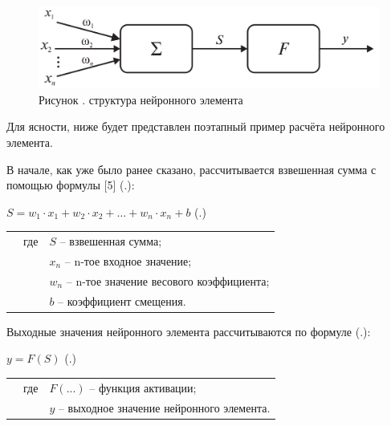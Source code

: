 {  \begin{figure}[H]
    \centering
    \def\svgwidth{\textwidth}
    \includegraphics[width=\textwidth]{images/Neuron.png}
    \caption*{\gostFont Рисунок \thechaptercntr .\theimagecntr \spc {--} структура нейронного элемента}
    \label{fig:Neuron}
  \end{figure} \addtocounter{imagecntr}{1}

  \par \redline Для ясности, ниже будет представлен поэтапный пример расчёта нейронного элемента.

  \par \redline В начале, как уже было ранее сказано, рассчитывается взвешенная сумма с помощью формулы [5] (\thechaptercntr .\theformulacntr):

	\formulaspace
	\par \redline $S = w_1 \cdot x_1 + w_2 \cdot x_2 + \dots + w_n \cdot x_n + b$ \hfill (\thechaptercntr .\theformulacntr) \redline
	\formulaspace \addtocounter{formulacntr}{1}

  \begin{tabular}{p{}p{}p{}}
		& где  & $S$ {--} взвешенная сумма; \\
		& 	   & $x_n$ {--} n-тое входное значение; \\
    & 	   & $w_n$ {--} n-тое значение весового коэффициента; \\
    & 	   & $b$ {--} коэффициент смещения. \\
  \end{tabular}

  \par \redline Выходные значения нейронного элемента рассчитываются по формуле (\thechaptercntr .\theformulacntr):

	\formulaspace
	\par \redline $y = F \left(S\right)$ \hfill (\thechaptercntr .\theformulacntr) \redline
	\formulaspace \addtocounter{formulacntr}{1}

  \begin{tabular}{p{}p{}p{}}
		& где  & $F({...})$ {--} функция активации; \\
		& 	   & $y$ {--} выходное значение нейронного элемента. \\
  \end{tabular}

}
